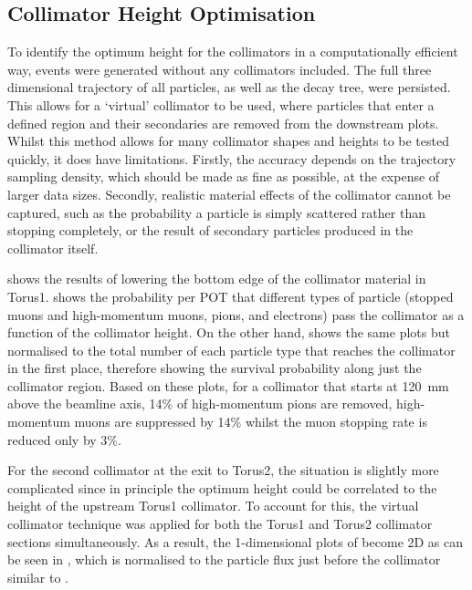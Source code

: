 \subsection{Collimator Height Optimisation}
\FigOptimMuBeamCollimTorusTwoContours
To identify the optimum height for the collimators in a computationally efficient way, events were generated without any collimators included.
The full three dimensional trajectory of all particles, as well as the decay tree, were persisted.
This allows for a `virtual' collimator to be used, where particles that enter a defined region and their secondaries are removed from the downstream plots.
Whilst this method allows for many collimator shapes and heights to be tested quickly, it does have limitations.
Firstly, the accuracy depends on the trajectory sampling density, which should be made as fine as possible, at the expense of larger data sizes.
Secondly, realistic material effects of the collimator cannot be captured, such as the probability a particle is simply scattered rather than stopping completely, or the result of secondary particles produced in the collimator itself.

 shows the results of lowering the bottom edge of the collimator material in Torus1.
 shows the probability per \ac{POT} that different types of particle (stopped muons and high-momentum muons, pions, and electrons) pass the collimator as a function of the collimator height.
On the other hand,  shows the same plots but normalised to the total number of each particle type that reaches the collimator in the first place, therefore showing the survival probability along just the collimator region.
Based on these plots, for a collimator that starts at 120~mm above the beamline axis, 14\% of high-momentum pions are removed, high-momentum muons are suppressed by 14\% whilst the muon stopping rate is reduced only by 3\%.


For the second collimator at the exit to Torus2, the situation is slightly more complicated since in principle the optimum height could be correlated to the height of the upstream Torus1 collimator.
To account for this, the virtual collimator technique was applied for both the Torus1 and Torus2 collimator sections simultaneously.
As a result, the 1-dimensional plots of  become 2D as can be seen in 
, which is normalised to the particle flux just before the collimator similar to .


